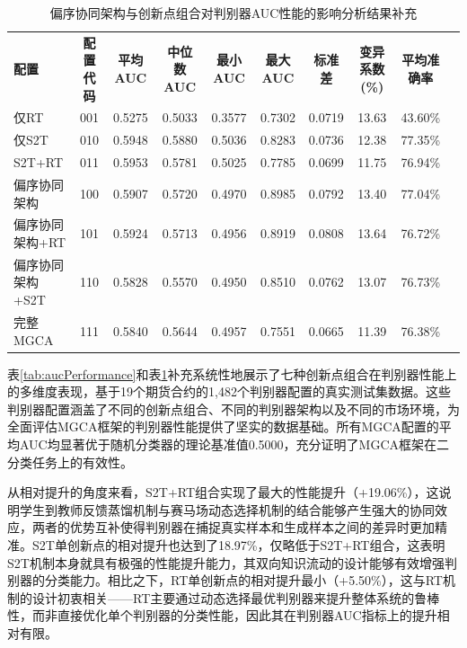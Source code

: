 \begin{table}
\centering
\caption{偏序协同架构与创新点组合对判别器AUC性能的影响分析结果补充}
\label{tab:aucPerformanceMultidimplus}
\footnotesize
\begin{tabular}{lccccccccc}
\toprule
\multirow{2}{*}{\textbf{配置}} & \multirow{2}{*}{\textbf{配置代码}} & \multirow{2}{*}{\textbf{平均AUC}} & \multirow{2}{*}{\textbf{中位数AUC}} & \multirow{2}{*}{\textbf{最小AUC}} & \multirow{2}{*}{\textbf{最大AUC}} & \multirow{2}{*}{\textbf{标准差}} & \multirow{2}{*}{\textbf{变异系数(\%)}} & \multirow{2}{*}{\textbf{平均准确率}} \\
& & & & & & & & \\
\midrule
仅RT & 001 & 0.5275 & 0.5033 & 0.3577 & 0.7302 & 0.0719 & 13.63 & 43.60\% \\
仅S2T & 010 & 0.5948 & 0.5880 & 0.5036 & 0.8283 & 0.0736 & 12.38 & 77.35\% \\
S2T+RT & 011 & 0.5953 & 0.5781 & 0.5025 & 0.7785 & 0.0699 & 11.75 & 76.94\% \\
偏序协同架构 & 100 & 0.5907 & 0.5720 & 0.4970 & 0.8985 & 0.0792 & 13.40 & 77.04\% \\
偏序协同架构+RT & 101 & 0.5924 & 0.5713 & 0.4956 & 0.8919 & 0.0808 & 13.64 & 76.72\% \\
偏序协同架构+S2T & 110 & 0.5828 & 0.5570 & 0.4950 & 0.8510 & 0.0762 & 13.07 & 76.73\% \\
完整MGCA & 111 & 0.5840 & 0.5644 & 0.4957 & 0.7551 & 0.0665 & 11.39 & 76.38\% \\
\bottomrule
\end{tabular}
\end{table}

表\ref{tab:aucPerformance}和表\ref{tab:aucPerformanceMultidimplus}补充系统性地展示了七种创新点组合在判别器性能上的多维度表现，基于19个期货合约的1,482个判别器配置的真实测试集数据。这些判别器配置涵盖了不同的创新点组合、不同的判别器架构以及不同的市场环境，为全面评估MGCA框架的判别器性能提供了坚实的数据基础。所有MGCA配置的平均AUC均显著优于随机分类器的理论基准值0.5000，充分证明了MGCA框架在二分类任务上的有效性。

从相对提升的角度来看，S2T+RT组合实现了最大的性能提升（+19.06\%），这说明学生到教师反馈蒸馏机制与赛马场动态选择机制的结合能够产生强大的协同效应，两者的优势互补使得判别器在捕捉真实样本和生成样本之间的差异时更加精准。S2T单创新点的相对提升也达到了18.97\%，仅略低于S2T+RT组合，这表明S2T机制本身就具有极强的性能提升能力，其双向知识流动的设计能够有效增强判别器的分类能力。相比之下，RT单创新点的相对提升最小（+5.50\%），这与RT机制的设计初衷相关——RT主要通过动态选择最优判别器来提升整体系统的鲁棒性，而非直接优化单个判别器的分类性能，因此其在判别器AUC指标上的提升相对有限。

